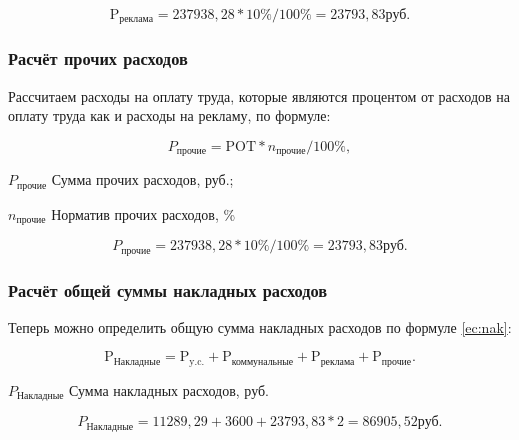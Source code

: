 \begin{equation*}
    \text{P}_\text{реклама} = 237938,28 * 10\% / 100\% = 23793,83 \text{руб}.
\end{equation*}

\subsubsection{Расчёт прочих расходов}

Рассчитаем расходы на оплату труда, которые являются процентом от расходов
на оплату труда как и расходы на рекламу, по формуле:

\begin{equation}
    P_\text{прочие} = \text{POT} * n_\text{прочие} / 100\%,
\end{equation}

\begin{eqexpl}[6ex]
    \item{$P_\text{прочие}$} Сумма прочих расходов, руб.;
    \item{$n_\text{прочие}$} Норматив прочих расходов, \%
\end{eqexpl}

\begin{equation*}
    P_\text{прочие} =  237938,28 * 10\% / 100\% = 23793,83 \text{руб}.
\end{equation*}

\subsubsection{Расчёт общей суммы накладных расходов}

Теперь можно определить общую сумма накладных расходов по формуле \ref{ec:nak}:

\begin{equation}
    \label{ec:nak}
    \text{P}_\text{Накладные} = \text{P}_\text{y.c.} + \text{P}_\text{коммунальные} + \text{P}_\text{реклама} + \text{P}_\text{прочие}.
\end{equation}

\begin{eqexpl}[9ex]
    \item{$P_\text{Накладные}$} Сумма накладных расходов, руб.
\end{eqexpl}

\begin{equation*}
    P_\text{Накладные} = 11289,29 + 3600 + 23793,83 * 2 = 86905,52 \text{руб.}
\end{equation*}

